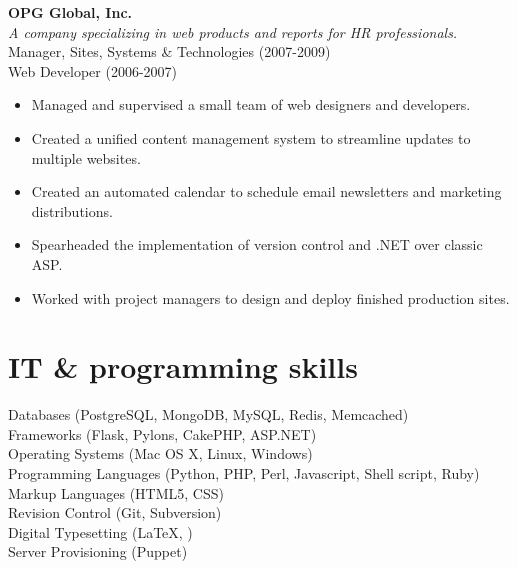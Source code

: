 \documentclass[10pt, a4paper]{article}
\newcommand{\years}[1]{\marginnote{\scriptsize #1}}
\begin{document}
\years{2006-2009}\textbf{OPG Global, Inc.}\\
\textit{A company specializing in web products and reports for HR professionals.}\\
Manager, Sites, Systems \& Technologies {\scriptsize (2007-2009)}\\
Web Developer {\scriptsize (2006-2007)}
\begin{itemize}
\item Managed and supervised a small team of web designers and developers.
\item Created a unified content management system to streamline updates to multiple websites.
\item Created an automated calendar to schedule email newsletters and marketing distributions.
\item Spearheaded the implementation of version control and .NET over classic ASP.
\item Worked with project managers to design and deploy finished production sites.
\end{itemize}

\section*{IT \& programming skills}
\noindent
Databases (PostgreSQL, MongoDB, MySQL, Redis, Memcached)\\
Frameworks (Flask, Pylons, CakePHP, ASP.NET)\\ %
Operating Systems (Mac OS X, Linux, Windows)\\
Programming Languages (Python, PHP, Perl, Javascript, Shell script, Ruby)\\ %
Markup Languages (HTML5, CSS)\\ %
Revision Control (Git, Subversion)\\
Digital Typesetting (\LaTeX, \XeTeX)\\
Server Provisioning (Puppet)\\
\end{document}
